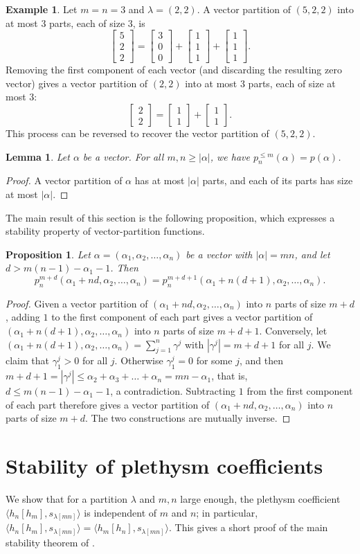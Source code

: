 \documentclass[reqno]{amsart}
\theoremstyle{plain}
\newtheorem{lemma}[theorem]{Lemma}
\newtheorem{proposition}[theorem]{Proposition}
\theoremstyle{definition}
\newtheorem{example}[theorem]{Example}
\theoremstyle{remark}
\theoremstyle{plain}
\newcommand{\vc}[2]{\begin{bmatrix}#1\\#2\end{bmatrix}}
\newcommand{\vcc}[3]{\begin{bmatrix}#1\\#2\\#3\end{bmatrix}}
\begin{document}
\begin{example}
Let $m=n=3$ and $\lambda=(2,2)$. A vector partition of $(5,2,2)$ into at most
$3$ parts, each of size $3$, is
$$
\vcc{5}{2}{2} = \vcc{3}{0}{0} + \vcc{1}{1}{1} + \vcc{1}{1}{1}.
$$
Removing the first component of each vector (and discarding the resulting zero
vector) gives a vector partition of $(2,2)$ into at most $3$ parts, each of
size at most $3$:
$$
\vc{2}{2} = \vc{1}{1} + \vc{1}{1}.
$$
This process can be reversed to recover the vector partition of $(5,2,2)$.
\end{example}

\begin{lemma}\label{no-role-of-m-and-n}
Let $\alpha$ be a vector. For all $m,n\geq |\alpha|$, we have $p_n^{\leq m}(\alpha)=p(\alpha)$.
\end{lemma}
\begin{proof}
A vector partition of $\alpha$ has at most $|\alpha|$ parts, and each of its
parts has size at most $|\alpha|$.
\end{proof}

The main result of this section is the following proposition, which
expresses a stability property of vector-partition functions.

\begin{proposition}\label{stability}
Let $\alpha=(\alpha_1,\alpha_2,\dots,\alpha_n)$ be a vector with $|\alpha|=mn$,
and let $d>m(n-1)-\alpha_1-1$. Then
$$p_n^{m+d}(\alpha_1+nd,\alpha_2,\dots,\alpha_n)=p_n^{m+d+1}(\alpha_1+n(d+1),\alpha_2,\dots,\alpha_n).$$
\end{proposition}
\begin{proof}
Given a vector partition of $(\alpha_1+nd,\alpha_2,\dots,\alpha_n)$ into $n$
parts of size $m+d$, adding $1$ to the first component of each part gives a
vector partition of $(\alpha_1+n(d+1),\alpha_2,\dots,\alpha_n)$ into $n$ parts
of size $m+d+1$. Conversely, let
$(\alpha_1+n(d+1),\alpha_2,\dots,\alpha_n)=\sum_{j=1}^n\gamma^j$ with
$|\gamma^j|=m+d+1$ for all $j$. We claim that $\gamma_1^j>0$ for all $j$.
Otherwise $\gamma_1^j=0$ for some $j$, and then
$m+d+1=|\gamma^j|\leq \alpha_2+\alpha_3+\dots+\alpha_n=mn-\alpha_1$, that is,
$d\le m(n-1)-\alpha_1-1$, a contradiction. Subtracting $1$ from the first
component of each part therefore gives a vector partition of
$(\alpha_1+nd,\alpha_2,\dots,\alpha_n)$ into $n$ parts of size $m+d$. The two
constructions are mutually inverse.
\end{proof}

\section{Stability of plethysm coefficients}\label{sec-stability}
We show that for a partition $\lambda$ and $m,n$ large enough, the plethysm
coefficient $\langle h_n[h_m],s_{\lambda[mn]}\rangle$ is independent of $m$ and
$n$; in particular,
$\langle h_n[h_m],s_{\lambda[mn]}\rangle=\langle h_m[h_n],s_{\lambda[mn]}\rangle$.
This gives a short proof of the main stability theorem of \cite{bow-pag}.
\end{document}
